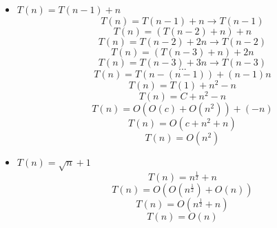 \documentclass[10pt,a4paper]{article}
\begin{document}
\begin{itemize}
		\item $T(n) = T(n-1) + n$
			\begin{equation*}
				T(n) = T(n-1) + n \rightarrow T(n-1)
			\end{equation*}
			\begin{equation*}
				T(n) = (T(n-2)+n)+n
			\end{equation*}
			\begin{equation*}
				T(n) = T(n-2)+2n \rightarrow T(n-2)
			\end{equation*}
			\begin{equation*}
				T(n) = (T(n-3)+n)+2n
			\end{equation*}
			\begin{equation*}
				T(n) = T(n-3)+3n \rightarrow T(n-3)
			\end{equation*}
			\begin{equation*}
				...
			\end{equation*}
			\begin{equation*}
				T(n) = T(n-(n-1))+(n-1)n
			\end{equation*}
			\begin{equation*}
				T(n) = T(1)+n^{2}-n
			\end{equation*}
			\begin{equation*}
				T(n) = C +n^{2}-n
			\end{equation*}
			\begin{equation*}
				T(n) = O(O(c)+O(n^{2}))+(-n)
			\end{equation*}
			\begin{equation*}
				T(n) = O(c+n^{2}+n)
			\end{equation*}
			\begin{equation*}
				T(n) = O(n^{2})
			\end{equation*}
			
		\item $T(n) = \sqrt{n} + 1$
			\begin{equation*}
				T(n) = n^{\frac{1}{2}} + n
			\end{equation*}
			\begin{equation*}
				T(n) = O(O(n^{\frac{1}{2}})+O(n))
			\end{equation*}
			\begin{equation*}
				T(n) = O(n^{\frac{1}{2}}+n)
			\end{equation*}
			\begin{equation*}
				T(n) = O(n)
			\end{equation*}
	\end{itemize}
\end{document}
